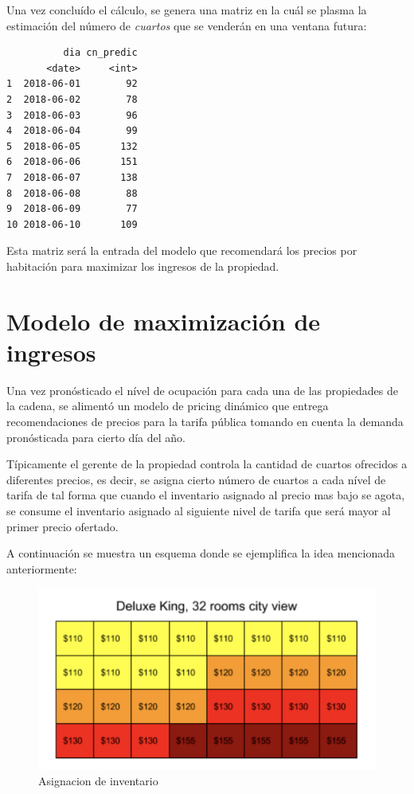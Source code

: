 Una vez concluído el cálculo, se genera una matriz en la cuál se plasma la estimación del número de \emph{cuartos} que se venderán en una ventana futura:

\begin{verbatim}
          dia cn_predic
       <date>     <int>
1  2018-06-01        92
2  2018-06-02        78
3  2018-06-03        96
4  2018-06-04        99
5  2018-06-05       132
6  2018-06-06       151
7  2018-06-07       138
8  2018-06-08        88
9  2018-06-09        77
10 2018-06-10       109
\end{verbatim}

Esta matriz será la entrada del modelo que recomendará los precios por habitación para maximizar los ingresos de la propiedad.


\section*{Modelo de maximización de ingresos}

Una vez pronósticado el nível de ocupación para cada una de las propiedades de la cadena, se alimentó un modelo de pricing dinámico que entrega recomendaciones de precios para la tarifa pública tomando en cuenta la demanda pronósticada para cierto día del año.

Típicamente el gerente de la propiedad controla la cantidad de cuartos ofrecidos a diferentes precios, es decir, se asigna cierto número de cuartos a cada nível de tarifa de tal forma que cuando el inventario asignado al precio mas bajo se agota, se consume el inventario asignado al siguiente nivel de tarifa que será mayor al primer precio ofertado.

A continuación se muestra un esquema donde se ejemplifica la idea mencionada anteriormente:

\begin{figure}[!]
  \includegraphics[width=\linewidth]{Figures/buckets.png}
  \caption{Asignacion de inventario}
  \label{fig:Asignacion de Inventario}
\end{figure}

